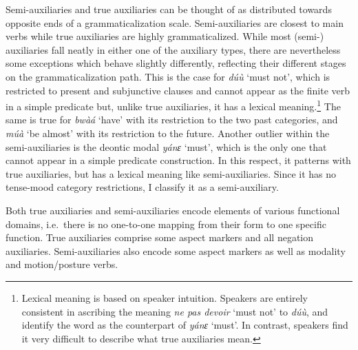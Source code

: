 Semi-auxiliaries and true auxiliaries can be thought of as distributed towards opposite ends of a grammaticalization scale. Semi-auxiliaries are closest to main verbs while true auxiliaries are highly grammaticalized. 
While most (semi-) auxiliaries fall neatly in either one of the auxiliary types, there are nevertheless some exceptions which behave slightly differently, reflecting their different stages on the grammaticalization path. This is the case for {\itshape dúù} `must not', which is restricted to present and subjunctive clauses and cannot appear as the finite verb in a simple predicate but, unlike true auxiliaries, it has a lexical meaning.\footnote{Lexical meaning is based on speaker intuition. Speakers are entirely consistent in ascribing the meaning {\itshape ne pas devoir}  `must not' to {\itshape dúù}, and identify the word as the counterpart of {\itshape yánɛ} `must'. In contrast, speakers find it very difficult to describe what true auxiliaries mean.} The same is true for {\itshape bwàá} `have' with its restriction to the two past categories, and {\itshape múà} `be almost' with its restriction to the future.
Another outlier within the semi-auxiliaries is the deontic modal {\itshape yánɛ} `must', which is the only one that cannot appear in a simple predicate construction. In this respect, it patterns with true auxiliaries, but has a lexical meaning like semi-auxiliaries. Since it has no tense-mood category restrictions, I classify it as a semi-auxiliary.

Both true auxiliaries and semi-auxiliaries encode elements of various functional domains, i.e.\ there is no one-to-one mapping from their form to one specific function.  True auxiliaries comprise some aspect markers and all negation auxiliaries. Semi-auxiliaries also encode some aspect markers as well as modality and motion/posture verbs.


















